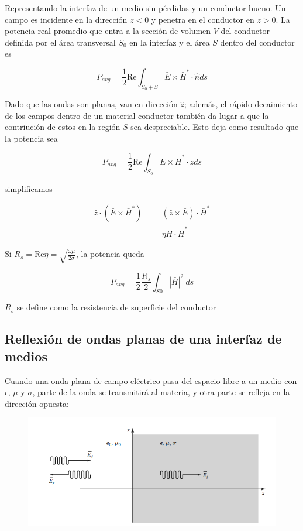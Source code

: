 Representando la interfaz de un medio sin pérdidas y un conductor bueno. Un campo es incidente en la dirección $z<0$ y penetra en el conductor en $z>0$. La potencia real promedio que entra a la sección de volumen $V$ del conductor definida por el área transversal $S_0$ en la interfaz y el área $S$ dentro del conductor es 

\begin{equation*}
P_{avg} = \frac{1}{2} \text{Re} \int_{S_0+S} \bar{E} \times \bar{H}^* \cdot \hat{n} d s
\end{equation*}

Dado que las ondas son planas, van en dirección $\hat{z}$; además, el rápido decaimiento de los campos dentro de un material conductor también da lugar a que la contriución de estos en la región $S$ sea despreciable. Esto deja como resultado que la potencia sea

\begin{equation*}
P_{avg} = \frac{1}{2} \text{Re} \int_{S_0} \bar{E} \times \bar{H}^* \cdot \hat{z} d s
\end{equation*}

simplificamos

\begin{eqnarray*}
\hat{z} \cdot (\bar{E} \times \bar{H}^*) &=& (\hat{z} \times \bar{E}) \cdot  \bar{H}^* \\
&=& \eta \bar{H} \cdot  \bar{H}^* 
\end{eqnarray*}

Si $R_s = \text{Re} \eta = \sqrt{\frac{\omega \mu}{2 \sigma}}$, la potencia queda

\begin{equation*}
P_{avg} = \frac{1}{2} \frac{R_s}{2} \int_{S0} |\bar{H}|^2 \ ds
\end{equation*}

$R_s$ se define como la resistencia de superficie del conductor

\subsection{Reflexión de ondas planas de una interfaz de medios}

Cuando una onda plana de campo eléctrico pasa del espacio libre a un medio con $\epsilon$, $\mu$ y $\sigma$, parte de la onda se transmitirá al materia, y otra parte se refleja en la dirección opuesta:

\begin{figure}[H]
    \centering
    \includegraphics[scale=0.6]{Waves/waves_f11.png}
\end{figure}

